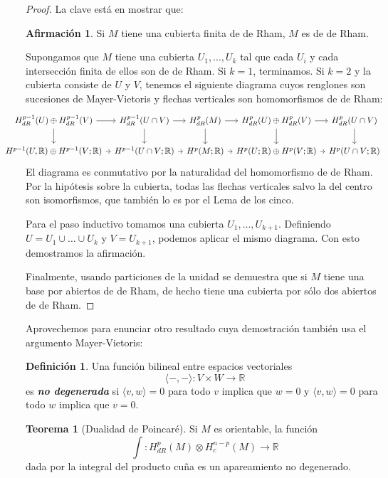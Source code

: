 \documentclass[spanish]{article}
\theoremstyle{definition}
\newtheorem*{defn}{Definición}
\newtheorem*{teo}{Teorema}
\newtheorem{af}{Afirmación}
\newcommand{\R}{\mathbb{R}}
\begin{document}
\begin{proof}
		La clave está en mostrar que:
		\begin{af}
			Si $M$ tiene una cubierta finita de de Rham, $M$ es de de Rham.
		\end{af}
		Supongamos que $M$ tiene una cubierta $U_1,\ldots,U_k$ tal que cada $U_i$ y cada intersección finita de ellos son de de Rham. Si $k=1$, terminamos. Si $k=2$ y la cubierta consiste de $U$ y $V$, tenemos el siguiente diagrama cuyos renglones son sucesiones de Mayer-Vietoris y flechas verticales son homomorfismos de de Rham:
		\[\hspace{-1cm}\begin{tikzcd}[column sep=tiny]
			H_{dR}^{p-1}(U)\oplus H_{dR}^{p-1}(V)\arrow[r]\arrow[d]&H_{dR}^{p-1}(U\cap V)\arrow[d]\arrow[r]&H^p_{dR}(M)\arrow[d]\arrow[r]&H_{dR}^p(U)\oplus H_{dR}^p(V)\arrow[d]\arrow[r]&H^p_{dR}(U\cap V)\arrow[d]\\
			H^{p-1}(U,\R)\oplus H^{p-1}(V;\R)\arrow[r]&H^{p-1}(U\cap V;\R)\arrow[r]&H^p(M;\R)\arrow[r]&H^p(U;\R)\oplus H^p(V;\R)\arrow[r]&H^p(U\cap V;\R)
		\end{tikzcd}\]
		El diagrama es conmutativo por la naturalidad del homomorfismo de de Rham. Por la hipótesis sobre la cubierta, todas las flechas verticales salvo la del centro son isomorfismos, que también lo es por el Lema de los cinco.
		
		Para el paso inductivo tomamos una cubierta $U_1,\ldots,U_{k+1}$. Definiendo $U=U_1\cup \ldots\cup U_k$ y $V=U_{k+1}$, podemos aplicar el mismo diagrama. Con esto demostramos la afirmación.
		
		Finalmente, usando particiones de la unidad se demuestra que si $M$ tiene una base por abiertos de de Rham, de hecho tiene una cubierta por sólo dos abiertos de de Rham.\fi
	\end{proof}
	
	Aprovechemos para enunciar otro resultado cuya demostración también usa el argumento Mayer-Vietoris:
	\begin{defn}
		Una función bilineal entre espacios vectoriales
		\[\langle-,-\rangle:V\times W\to \R\]
		es \textbf{\textit{no degenerada}} si $\langle v,w\rangle=0$ para todo $v$ implica que $w=0$ y $\langle v,w\rangle=0$ para todo $w$ implica que $v=0$.
	\end{defn}
	\begin{teo}[Dualidad de Poincaré]
		Si $M$ es orientable, la función
		\[\int:H_{dR}^{p}(M)\otimes H^{n-p}_c(M)\to\R\]
		dada por la integral del producto cuña es un apareamiento no degenerado.
	\end{teo}
	
\end{document}

